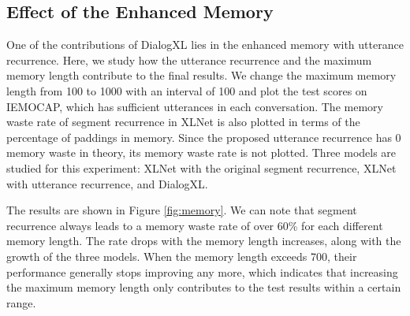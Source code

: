 \documentclass[letterpaper]{article} \usepackage{aaai21}  \usepackage{times}  \usepackage{helvet} \usepackage{courier}  \usepackage[hyphens]{url}  \usepackage{graphicx} \usepackage{amstext}
\begin{document}
\begin{table}[t]
	\centering
	\caption{Overall performance on the four datasets. The scores marked by ``*'' is based on our re-implementation, because of the differences in evaluation metrics and data statistics between the corresponding work and ours.}
	\label{tab:overall}
\end{table}


\subsection{Effect of the Enhanced Memory}
One of the contributions of DialogXL lies in the enhanced memory with utterance recurrence. Here, we study how the utterance recurrence and the maximum memory length contribute to the final results. We change the maximum memory length from 100 to 1000 with an interval of 100 and plot the test scores on IEMOCAP, which has sufficient utterances in each conversation. The memory waste rate of segment recurrence in XLNet is also plotted in terms of the percentage of paddings in memory. Since the proposed utterance recurrence has 0 memory waste in theory, its memory waste rate is not plotted. Three models are studied for this experiment: XLNet with the original segment recurrence, XLNet with utterance recurrence, and DialogXL. 

The results are shown in Figure \ref{fig:memory}. We can note that segment recurrence always leads to a memory waste rate of over 60\% for each different memory length. The rate drops with the memory length increases, along with the growth of the three models. When the memory length exceeds 700, their performance generally stops improving any more, which indicates that increasing the maximum memory length only contributes to the test results within a certain range.
\end{document}
